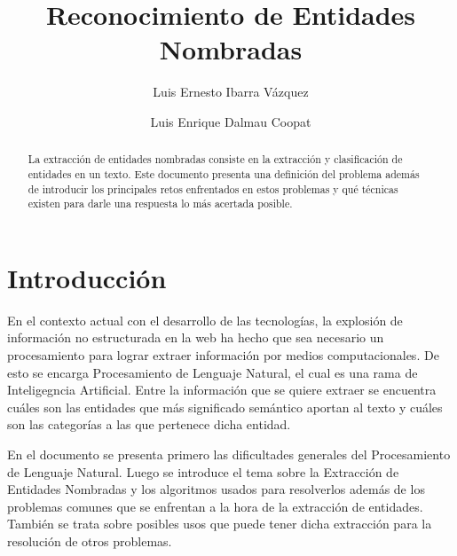 \documentclass[runningheads]{llncs}
\begin{document}
%
\title{Reconocimiento de Entidades Nombradas}
%
%
\author{Luis Ernesto Ibarra Vázquez \and
Luis Enrique Dalmau Coopat}
%
%
%
\maketitle              %
%
\begin{abstract}

La extracción de entidades nombradas consiste en la extracción y clasificación de entidades en un texto. Este documento presenta una definición del problema además de introducir los principales retos enfrentados en estos problemas y qué técnicas existen para darle una respuesta lo más acertada posible. 

\end{abstract}
%
%
%
\section{Introducción}

En el contexto actual con el desarrollo de las tecnologías, la explosión de información no estructurada en la web ha hecho que sea necesario un procesamiento para lograr extraer información por medios computacionales. De esto se encarga Procesamiento de Lenguaje Natural, el cual es una rama de Inteligegncia Artificial. Entre la información que se quiere extraer se encuentra cuáles son las entidades que más significado semántico aportan al texto y cuáles son las categorías a las que pertenece dicha entidad.

En el documento se presenta primero las dificultades generales del Procesamiento de Lenguaje Natural. Luego se introduce el tema sobre la Extracción de Entidades Nombradas y los algoritmos usados para resolverlos además de los problemas comunes que se enfrentan a la hora de la extracción de entidades. También se trata sobre posibles usos que puede tener dicha extracción para la resolución de otros problemas.
\end{document}
